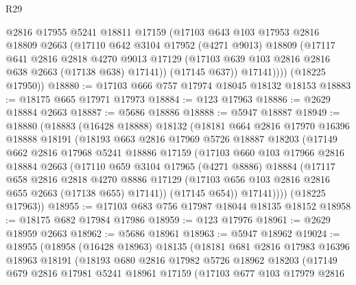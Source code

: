 \begin{lexlean}{R29}
\begin{coremodule}
            @2816
            @17955
            @5241
            @18811
            @17159
            (@17103
              @643
              @103
              @17953
              @2816
              @18809
              @2663
              (@17110
                @642
                @3104
                @17952
                (@4271 @9013)
                @18809
                (@17117
                  @641
                  @2816
                  @2818
                  @4270
                  @9013
                  @17129
                  (@17103 @639 @103 @2816 @2816 @638 @2663 (@17138 @638) @17141))
                (@17145 @637))
              @17141))))
      (@18225 @17950))
@18880 := @17103 @666 @757 @17974 @18045 @18132 @18153
@18883 := @18175 @665 @17971 @17973
@18884 := @123 @17963
@18886 := @2629 @18884 @2663
@18887 := @5686 @18886
@18888 := @5947 @18887
@18949 := @18880
    (@18883
      (@16428 @18888)
      @18132
      (@18181
        @664
        @2816
        @17970
        @16396
        @18888
        @18191
        (@18193
          @663
          @2816
          @17969
          @5726
          @18887
          @18203
          (@17149
            @662
            @2816
            @17968
            @5241
            @18886
            @17159
            (@17103
              @660
              @103
              @17966
              @2816
              @18884
              @2663
              (@17110
                @659
                @3104
                @17965
                (@4271 @8886)
                @18884
                (@17117
                  @658
                  @2816
                  @2818
                  @4270
                  @8886
                  @17129
                  (@17103 @656 @103 @2816 @2816 @655 @2663 (@17138 @655) @17141))
                (@17145 @654))
              @17141))))
      (@18225 @17963))
@18955 := @17103 @683 @756 @17987 @18044 @18135 @18152
@18958 := @18175 @682 @17984 @17986
@18959 := @123 @17976
@18961 := @2629 @18959 @2663
@18962 := @5686 @18961
@18963 := @5947 @18962
@19024 := @18955
    (@18958
      (@16428 @18963)
      @18135
      (@18181
        @681
        @2816
        @17983
        @16396
        @18963
        @18191
        (@18193
          @680
          @2816
          @17982
          @5726
          @18962
          @18203
          (@17149
            @679
            @2816
            @17981
            @5241
            @18961
            @17159
            (@17103
              @677
              @103
              @17979
              @2816

\end{coremodule}
\end{lexlean}
